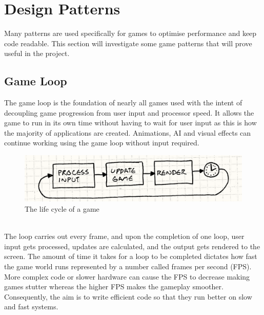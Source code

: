 \documentclass[a4paper]{report}
\begin{document}
\section{Design Patterns}
Many patterns are used specifically for games to optimise performance and keep code readable. This section will investigate some game patterns that will prove useful in the project. 

\subsection{Game Loop}
The game loop is the foundation of nearly all games used with the intent of decoupling game progression from user input and processor speed. It allows the game to run in its own time without having to wait for user input as this is how the majority of applications are created. Animations, AI and visual effects can continue working using the game loop without input required. 
\begin{figure}[h]
\centering
\includegraphics[scale=0.55]{game-loop-simple}
\caption{The life cycle of a game \cite{GPP}}
\end{figure}
\\The loop carries out every frame, and upon the completion of one loop, user input gets processed, updates are calculated, and the output gets rendered to the screen. The amount of time it takes for a loop to be completed dictates how fast the game world runs represented by a number called frames per second (FPS). More complex code or slower hardware can cause the FPS to decrease making games stutter whereas the higher FPS makes the gameplay smoother. Consequently, the aim is to write efficient code so that they run better on slow and fast systems. \cite{GPP}
\end{document}
